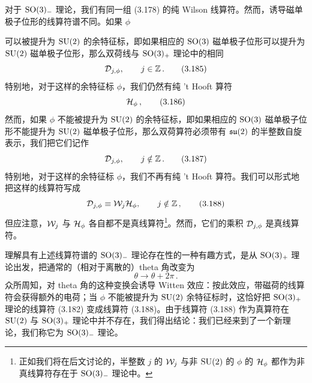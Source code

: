 对于 $\mathrm{SO}(3)_-$ 理论，我们有同一组 (3.178) 的纯 Wilson 线算符。然而，诱导磁单极子位形的线算符谱不同。如果 $\phi$


可以被提升为 $\mathrm{SU}(2)$ 的余特征标，即如果相应的 $\mathrm{SO}(3)$ 磁单极子位形可以提升为 $\mathrm{SU}(2)$ 磁单极子位形，那么双荷线与 $\mathrm{SO}(3)_+$ 理论中的相同
\begin{equation}
    \mathcal{D}_{j,\phi} ,\qquad j \in \mathbb{Z} \,.
    \tag{3.185}
\end{equation}
特别地，对于这样的余特征标 $\phi$，我们仍然有纯 't Hooft 算符
\begin{equation}
    \mathcal{H}_\phi \,,
    \tag{3.186}
\end{equation}
然而，如果 $\phi$ 不能被提升为 $\mathrm{SU}(2)$ 的余特征标，即如果相应的 $\mathrm{SO}(3)$ 磁单极子位形不能提升为 $\mathrm{SU}(2)$ 磁单极子位形，那么双荷算符必须带有 $\mathfrak{su}(2)$ 的半整数自旋表示，我们把它们记作
\begin{equation}
    \mathcal{D}_{j,\phi} ,\qquad j \notin \mathbb{Z} \,.
    \tag{3.187}
\end{equation}
特别地，对于这样的余特征标 $\phi$，我们不再有纯 't Hooft 算符。我们可以形式地把这样的线算符写成
\begin{equation}
    \mathcal{D}_{j,\phi} \equiv \mathcal{W}_j \mathcal{H}_\phi ,\qquad j \notin \mathbb{Z} \,,
    \tag{3.188}
\end{equation}
但应注意，$\mathcal{W}_j$ 与 $\mathcal{H}_\phi$ 各自都不是真线算符\footnote{正如我们将在后文讨论的，半整数 $j$ 的 $\mathcal{W}_j$ 与非 $\mathrm{SU}(2)$ 的 $\phi$ 的 $\mathcal{H}_\phi$ 都作为非真线算符存在于 $\mathrm{SO}(3)_-$ 理论中。}。然而，它们的乘积 $\mathcal{D}_{j,\phi}$ 是真线算符。


理解具有上述线算符谱的 $\mathrm{SO}(3)_-$ 理论存在性的一种有趣方式，是从 $\mathrm{SO}(3)_+$ 理论出发，把通常的（相对于离散的）theta 角改变为
\begin{equation}
    \theta \to \theta + 2\pi \,.
    \tag{3.189}
\end{equation}
众所周知，对 theta 角的这种变换会诱导 Witten 效应：按此效应，带磁荷的线算符会获得额外的电荷；当 $\phi$ 不能被提升为 $\mathrm{SU}(2)$ 余特征标时，这恰好把 $\mathrm{SO}(3)_+$ 理论的线算符 (3.182) 变成线算符 (3.188)。由于线算符 (3.188) 作为真算符在 $\mathrm{SU}(2)$ 与 $\mathrm{SO}(3)_+$ 理论中并不存在，我们得出结论：我们已经来到了一个新理论，我们称它为 $\mathrm{SO}(3)_-$ 理论。

